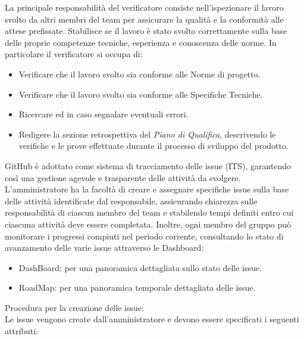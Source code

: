 La principale responsabilità del verificatore consiste nell’ispezionare il lavoro svolto da altri membri del team per assicurare la qualità e la conformità alle attese prefissate. Stabilisce se il lavoro è stato svolto correttamente sulla base delle proprie competenze tecniche, esperienza e conoscenza delle norme.
In particolare il verificatore si occupa di:
\begin{itemize}
    \item Verificare che il lavoro svolto sia conforme alle Norme di progetto.
    \item Verificare che il lavoro svolto sia conforme alle Specifiche Tecniche.
    \item Ricercare ed in caso segnalare eventuali errori.
    \item Redigere la sezione retrospettiva del \textit{Piano di Qualifica}, descrivendo le verifiche e le prove effettuate durante il processo di sviluppo del prodotto.
\end{itemize}
GitHub è adottato come sistema di tracciamento delle issue (ITS), garantendo così una gestione agevole e trasparente delle attività da svolgere.
L’amministratore ha la facoltà di creare e assegnare specifiche issue sulla base delle attività identificate dal responsabile, assicurando chiarezza sulle responsabilità di ciascun membro del team e stabilendo tempi definiti entro cui ciascuna attività deve essere completata. Inoltre, ogni membro del gruppo può monitorare i progressi compiuti nel periodo corrente, consultando lo stato di avanzamento delle varie issue attraverso le Dashboard:
\begin{itemize}
    \item DashBoard: per una panoramica dettagliata sullo stato delle issue.
    \item RoadMap: per una panoramica temporale dettagliata delle issue.
\end{itemize}
Procedura per la creazione delle issue:\\
Le issue vengono create dall’amministratore e devono essere specificati i seguenti attributi:

